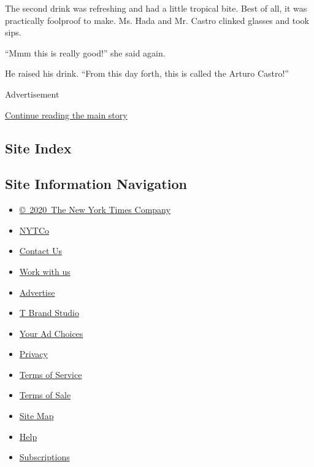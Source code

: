 The second drink was refreshing and had a little tropical bite. Best of
all, it was practically foolproof to make. Ms. Hada and Mr. Castro
clinked glasses and took sips.

``Mmm this is really good!'' she said again.

He raised his drink. ``From this day forth, this is called the Arturo
Castro!''

Advertisement

\protect\hyperlink{after-bottom}{Continue reading the main story}

\hypertarget{site-index}{%
\subsection{Site Index}\label{site-index}}

\hypertarget{site-information-navigation}{%
\subsection{Site Information
Navigation}\label{site-information-navigation}}

\begin{itemize}
\tightlist
\item
  \href{https://help.nytimes.com/hc/en-us/articles/115014792127-Copyright-notice}{©~2020~The
  New York Times Company}
\end{itemize}

\begin{itemize}
\tightlist
\item
  \href{https://www.nytco.com/}{NYTCo}
\item
  \href{https://help.nytimes.com/hc/en-us/articles/115015385887-Contact-Us}{Contact
  Us}
\item
  \href{https://www.nytco.com/careers/}{Work with us}
\item
  \href{https://nytmediakit.com/}{Advertise}
\item
  \href{http://www.tbrandstudio.com/}{T Brand Studio}
\item
  \href{https://www.nytimes.com/privacy/cookie-policy\#how-do-i-manage-trackers}{Your
  Ad Choices}
\item
  \href{https://www.nytimes.com/privacy}{Privacy}
\item
  \href{https://help.nytimes.com/hc/en-us/articles/115014893428-Terms-of-service}{Terms
  of Service}
\item
  \href{https://help.nytimes.com/hc/en-us/articles/115014893968-Terms-of-sale}{Terms
  of Sale}
\item
  \href{https://spiderbites.nytimes.com}{Site Map}
\item
  \href{https://help.nytimes.com/hc/en-us}{Help}
\item
  \href{https://www.nytimes.com/subscription?campaignId=37WXW}{Subscriptions}
\end{itemize}
